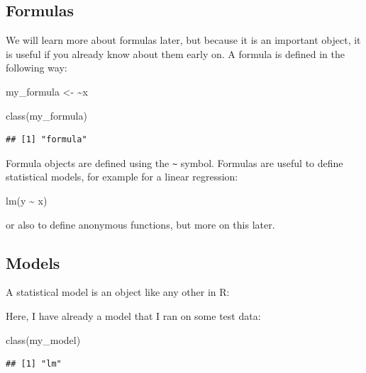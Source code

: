 \documentclass[
]{article}
\newenvironment{Shaded}{\begin{snugshade}}{\end{snugshade}}
\newcommand{\ErrorTok}[1]{\textcolor[rgb]{0.64,0.00,0.00}{\textbf{#1}}}
\newcommand{\FunctionTok}[1]{\textcolor[rgb]{0.00,0.00,0.00}{#1}}
\newcommand{\NormalTok}[1]{#1}
\newcommand{\OtherTok}[1]{\textcolor[rgb]{0.56,0.35,0.01}{#1}}
\newcommand{\SpecialCharTok}[1]{\textcolor[rgb]{0.00,0.00,0.00}{#1}}
\begin{document}
\hypertarget{formulas}{%
\subsection{Formulas}\label{formulas}}

We will learn more about formulas later, but because it is an important object, it is useful if you
already know about them early on. A formula is defined in the following way:

\begin{Shaded}
\begin{Highlighting}[]
\NormalTok{my\_formula }\OtherTok{\textless{}{-}} \ErrorTok{\textasciitilde{}}\NormalTok{x}

\FunctionTok{class}\NormalTok{(my\_formula)}
\end{Highlighting}
\end{Shaded}

\begin{verbatim}
## [1] "formula"
\end{verbatim}

Formula objects are defined using the \texttt{\textasciitilde{}} symbol. Formulas are useful to define statistical models,
for example for a linear regression:

\begin{Shaded}
\begin{Highlighting}[]
\FunctionTok{lm}\NormalTok{(y }\SpecialCharTok{\textasciitilde{}}\NormalTok{ x)}
\end{Highlighting}
\end{Shaded}

or also to define anonymous functions, but more on this later.

\hypertarget{models}{%
\subsection{Models}\label{models}}

A statistical model is an object like any other in R:

Here, I have already a model that I ran on some test data:

\begin{Shaded}
\begin{Highlighting}[]
\FunctionTok{class}\NormalTok{(my\_model)}
\end{Highlighting}
\end{Shaded}

\begin{verbatim}
## [1] "lm"
\end{verbatim}
\end{document}
